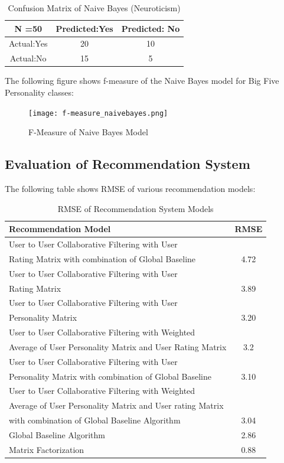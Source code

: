 \documentclass[journal]{IEEEtran}
\begin{document}
\begin{table}[!ht]
\centering
\begin{tabular}{ |c|c|c| }
 \hline
 N =50 & Predicted:Yes & Predicted: No \\
 \hline
 Actual:Yes&20 & 10 \\
 \hline
 Actual:No&15 & 5 \\
 \hline
\end{tabular}
 \caption{Confusion Matrix of Naive Bayes (Neuroticism)}
\end{table}

The following figure shows f-measure of the Naive Bayes model for Big Five Personality classes:
\begin{figure}[!ht]
\centering
\texttt{[image: f-measure\_naivebayes.png]}
\caption{F-Measure of Naive Bayes Model}
\label{fig:f-measure_naivebayes}
\end{figure}

\subsection{Evaluation of Recommendation System}

The following table shows RMSE of various recommendation models:\\
  \begin{table}[!ht]
    \centering
    \begin{tabular}{| l | c |}
      \hline
      {\bf Recommendation Model} & {\bf RMSE}\\
      \hline
      User to User Collaborative Filtering with User & \\ Rating Matrix with combination of Global Baseline & 4.72\\
      \hline
      User to User Collaborative Filtering with User & \\ Rating Matrix & 3.89\\
      \hline
      User to User Collaborative Filtering with User & \\ Personality Matrix & 3.20\\
      \hline
      User to User Collaborative Filtering with Weighted & \\ Average of User Personality Matrix and User Rating Matrix & 3.2\\
      \hline
      User to User Collaborative Filtering with User & \\ Personality Matrix with combination of Global Baseline & 3.10\\
      \hline
      User to User Collaborative Filtering with Weighted & \\ Average of User Personality Matrix and User rating Matrix & \\ with combination of Global Baseline Algorithm & 3.04\\
      \hline
      Global Baseline Algorithm & 2.86\\
      \hline
      Matrix Factorization & 0.88\\
      \hline
    \end{tabular}
    \caption{RMSE of Recommendation System Models}
  \end{table}
\end{document}
